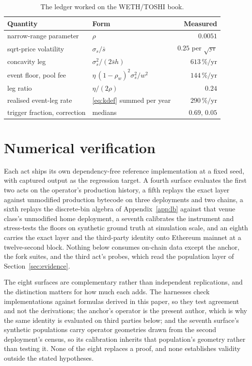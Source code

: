 \documentclass[11pt,a4paper]{article}
\theoremstyle{definition}
\theoremstyle{plain}
\theoremstyle{remark}
\begin{document}
\begin{table}[H]
\centering
\caption{The ledger worked on the WETH/TOSHI book.}
\label{tab:worked}
\begin{tabular}{@{}llr@{}}
\toprule
Quantity & Form & Measured \\
\midrule
narrow-range parameter & $\rho$ & $0.0051$ \\
sqrt-price volatility & $\sigma_s/\bar s$ & $0.25$ per $\sqrt{\text{yr}}$ \\
concavity leg & $\sigma_s^2/(2\bar s h)$ & $613\,\%/\text{yr}$ \\
event floor, pool fee & $\eta\,(1-\rho_w)^2\sigma_s^2/w^2$ & $144\,\%/\text{yr}$ \\
leg ratio & $\eta/(2\rho)$ & $0.24$ \\
realised event-leg rate & \eqref{eq:kdef} summed per year & $290\,\%/\text{yr}$ \\
trigger fraction, correction & medians & $0.69$, $0.05$ \\
\bottomrule
\end{tabular}
\end{table}

\section{Numerical verification}\label{sec:verification}

Each act ships its own dependency-free reference implementation at a fixed seed, with captured output as the regression target. A fourth surface evaluates the first two acts on the operator's 
production history, a fifth replays the exact layer against unmodified production bytecode on three deployments and two chains, a sixth replays the discrete-bin algebra of Appendix~\ref{app:lb} 
against that venue class's unmodified home deployment, a seventh calibrates the instrument and stress-tests the floors on synthetic ground truth at simulation scale, and an eighth carries the 
exact layer and the third-party identity onto Ethereum mainnet at a twelve-second block. Nothing below consumes on-chain data except the anchor, the fork suites, and the third act's probes, 
which read the population layer of Section~\ref{sec:evidence}.

The eight surfaces are complementary rather than independent replications, and the distinction matters for how much each adds. The harnesses check implementations against formulas derived 
in this paper, so they test agreement and not the derivations; the anchor's operator is the present author, which is why the same identity is evaluated on third parties below; and the seventh 
surface's synthetic populations carry operator geometries drawn from the second deployment's census, so its calibration inherits that population's geometry rather than testing it. None of 
the eight replaces a proof, and none establishes validity outside the stated hypotheses.
\end{document}
